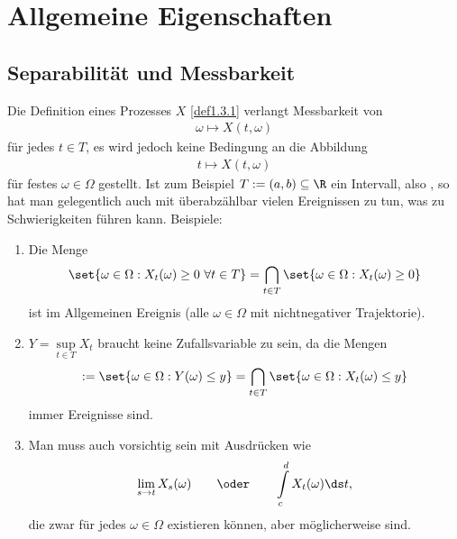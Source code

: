 
\chapter{Allgemeine Eigenschaften}
\section{Separabilität und Messbarkeit}

Die Definition eines Prozesses $X$ \ref{def1.3.1} verlangt Messbarkeit von
\begin{align*}
	\omega\mapsto X(t,\omega)
\end{align*}
für jedes $t\in T$, es wird jedoch keine Bedingung an die Abbildung
\begin{align*}
	t\mapsto X(t,\omega)
\end{align*}
für festes $\omega\in\Omega$ gestellt.\nl
Ist zum Beispiel $T:=(a,b)\subseteq\R$ ein Intervall, also , so hat man gelegentlich auch mit überabzählbar vielen Ereignissen zu tun, was zu Schwierigkeiten führen kann.
Beispiele:
\begin{enumerate}
	\item Die Menge
	\begin{align*}
		\set{\omega\in\Omega:X_t(\omega)\geq0~\forall t\in T}
		=\bigcap\limits_{t\in T}\set{\omega\in\Omega:X_t(\omega)\geq0}
	\end{align*}
	ist im Allgemeinen  Ereignis
	(alle $\omega\in\Omega$ mit nichtnegativer Trajektorie).
	\item $Y=\sup\limits_{t\in T}X_t$ braucht keine Zufallsvariable zu sein, da die Mengen
	\begin{align*}
		[Y\leq y]:=\set{\omega\in\Omega:Y(\omega)\leq y}=\bigcap\limits_{t\in T}\set{\omega\in\Omega:X_t(\omega)\leq y}
	\end{align*}
	 immer Ereignisse sind.
	\item Man muss auch vorsichtig sein mit Ausdrücken wie
	\begin{align*}
		\lim\limits_{s\to t} X_s(\omega)
		\qquad\oder\qquad
		\int\limits_c^d X_t(\omega)\ds t,
	\end{align*}		
	die zwar für jedes $\omega\in\Omega$ existieren können, aber möglicherweise  sind.
\end{enumerate}

